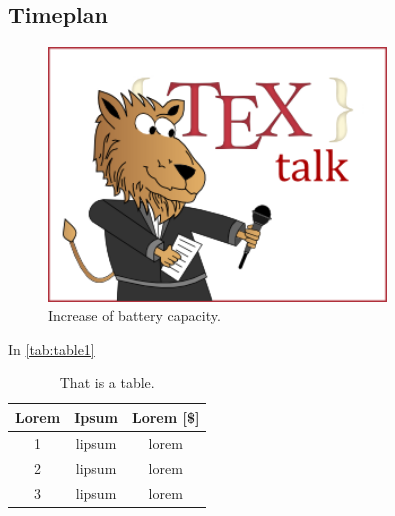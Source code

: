 
\subsection{Timeplan}


\begin{figure}[H]
    \centering
    \includegraphics[width = 0.8\textwidth ]{figures/tex.png}
    \caption{Increase of battery capacity. \cite{china_too_many}}
    \label{fig:batteryIncreas}
\end{figure}

\lipsum[6-7]

In \autoref{tab:table1}

\begin{table}[H]
    \centering
    \caption{That is a table.}
    \begin{tabular}{|c|c|c|}
    \centering
    \textbf{Lorem} & \textbf{Ipsum} & \textbf{Lorem [\$]} \\ \hline \hline
1   & lipsum    & lorem     \\ \hline   
2   & lipsum    & lorem   \\ \hline
3   & lipsum    & lorem  
    \end{tabular}
    \label{tab:table1}
\end{table}

\lipsum[8]